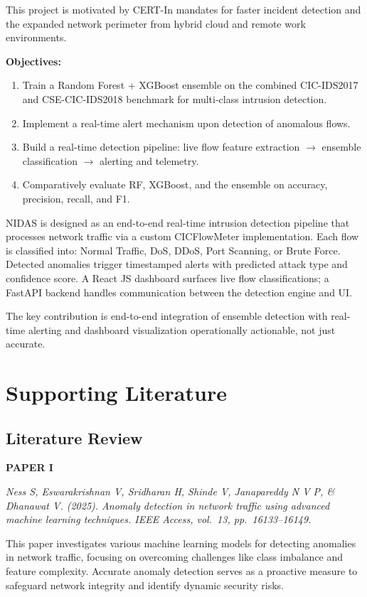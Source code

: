 \documentclass[12pt,a4paper]{report}
\begin{document}
This project is motivated by CERT-In mandates for faster incident detection and the expanded network perimeter from hybrid cloud and remote work environments.

\textbf{Objectives:}
\vspace{-0.6em}
\begin{enumerate}
    \item Train a Random Forest + XGBoost ensemble on the combined CIC-IDS2017 and CSE-CIC-IDS2018 benchmark for multi-class intrusion detection.
    \item Implement a real-time alert mechanism upon detection of anomalous flows.
    \item Build a real-time detection pipeline: live flow feature extraction $\rightarrow$ ensemble classification $\rightarrow$ alerting and telemetry.
    \item Comparatively evaluate RF, XGBoost, and the ensemble on accuracy, precision, recall, and F1.
\end{enumerate}

NIDAS is designed as an end-to-end real-time intrusion detection pipeline that processes network traffic via a custom CICFlowMeter implementation. Each flow is classified into: Normal Traffic, DoS, DDoS, Port Scanning, or Brute Force. Detected anomalies trigger timestamped alerts with predicted attack type and confidence score. A React JS dashboard surfaces live flow classifications; a FastAPI backend handles communication between the detection engine and UI.

The key contribution is end-to-end integration of ensemble detection with real-time alerting and dashboard visualization operationally actionable, not just accurate.


\newpage
\chapter{Supporting Literature}
\section{Literature Review}
\textbf{PAPER I}

\textit{Ness S, Eswarakrishnan V, Sridharan H, Shinde V, Janapareddy N V P, \& Dhanawat V. (2025). Anomaly detection in network traffic using advanced machine learning techniques. IEEE Access, vol.\ 13, pp.\ 16133--16149.}

This paper investigates various machine learning models for detecting anomalies in network traffic, focusing on overcoming challenges like class imbalance and feature complexity. Accurate anomaly detection serves as a proactive measure to safeguard network integrity and identify dynamic security risks.
\end{document}
